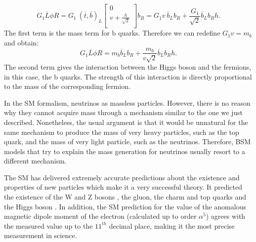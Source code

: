 \begin{equation}
	G_1 \overline{L}\phi R = G_1 ~(\overline{t}, \overline{b})_L \begin{bmatrix}
	0 \\
	v+\frac{h}{\sqrt{2}} \\
	\end{bmatrix} b_R = G_1 v ~\overline{b}_L b_R + \frac{G_1}{\sqrt{2}} \overline{b}_L b_R h.
\end{equation}
The first term is the mass term for b quarks. Therefore we can redefine $G_1 v = m_b$ and obtain:
\begin{equation}
	G_1 \overline{L}\phi R=m_b \overline{b}_L b_R + \frac{m_b}{v\sqrt{2}} \overline{b}_L b_R h.
\end{equation}
The second term gives the interaction between the Higgs boson and the fermions, in this case, the b quarks. The strength of this interaction is directly proportional to the mass of the corresponding fermion.

In the SM formalism, neutrinos as massless particles. However, there is no reason why they cannot acquire mass through a mechanism similar to the one we just described. Nonetheless, the usual argument is that it would be unnatural for the same mechanism to produce the mass of very heavy particles, such as the top quark, and the mass of very light particle, such as the neutrinos. Therefore, BSM models that try to explain the mass generation for neutrinos usually resort to a different mechanism.


The SM has delivered extremely accurate predictions about the existence and properties of new particles which make it a very successful theory. It predicted the existence of the W and Z bosons \cite{Glashow-Weinberg-Salam}, the gluon, the charm and top quarks and the Higgs boson \cite{Higgs,EnglertBrout,Guralnik}. In addition, the SM prediction for the value of the anomalous magnetic dipole moment of the electron (calculated up to order $\alpha^5$) agrees with the measured value up to the $11^{th}$ decimal place, making it the most precise measurement in science.

